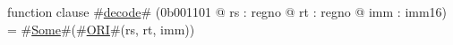 function clause #\hyperref[zdecode]{decode}# (0b001101 @ rs : regno @ rt : regno @ imm : imm16) =
  #\hyperref[zSome]{Some}#(#\hyperref[zORI]{ORI}#(rs, rt, imm))
